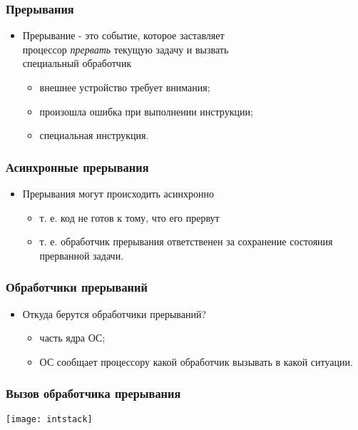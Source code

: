 \begin{frame}
\frametitle{Прерывания}
\begin{itemize}
    \item<1->Прерывание - это событие, которое заставляет \\
    процессор \emph{прервать} текущую задачу и вызвать \\
    специальный обработчик
    \begin{itemize}
        \item<2-> внешнее устройство требует внимания;
        \item<3-> произошла ошибка при выполнении инструкции;
        \item<4-> специальная инструкция.
    \end{itemize}
\end{itemize}
\end{frame}

\begin{frame}
\frametitle{Асинхронные прерывания}
\begin{itemize}
    \item<1->Прерывания могут происходить асинхронно
    \begin{itemize}
        \item<1->т. е. код не готов к тому, что его прервут
        \item<2->т. е. обработчик прерывания ответственен за
        сохранение состояния прерванной задачи.
    \end{itemize}
\end{itemize}
\end{frame}

\begin{frame}
\frametitle{Обработчики прерываний}
\begin{itemize}
    \item<1-> Откуда берутся обработчики прерываний?
    \begin{itemize}
        \item<2-> часть ядра ОС;
        \item<2-> ОС сообщает процессору какой обработчик вызывать
        в какой ситуации.
    \end{itemize}
\end{itemize}
\end{frame}

\begin{frame}
\frametitle{Вызов обработчика прерывания}
    \hspace*{\fill}
    \texttt{[image: intstack]}
    \hspace*{\fill}\hspace*{\fill}
\end{frame}


